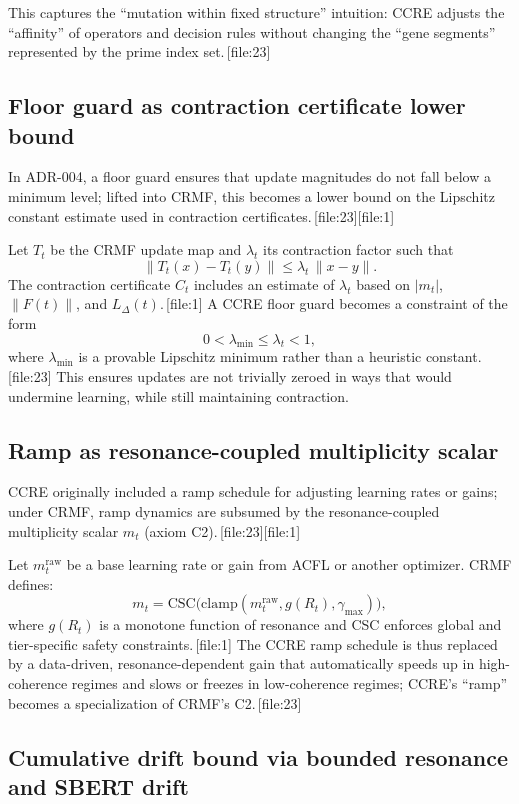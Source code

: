 \documentclass[11pt]{article}
\begin{document}
This captures the ``mutation within fixed structure'' intuition: CCRE adjusts the ``affinity'' of operators and decision rules without changing the ``gene segments'' represented by the prime index set.\,[file:23]

\subsection{Floor guard as contraction certificate lower bound}

In ADR-004, a floor guard ensures that update magnitudes do not fall below a minimum level; lifted into CRMF, this becomes a lower bound on the Lipschitz constant estimate used in contraction certificates.\,[file:23][file:1]

Let $T_t$ be the CRMF update map and $\lambda_t$ its contraction factor such that
\[
  \|T_t(x) - T_t(y)\| \le \lambda_t\,\|x-y\|.
\]
The contraction certificate $C_t$ includes an estimate of $\lambda_t$ based on $|m_t|$, $\|F(t)\|$, and $L_\Delta(t)$.\,[file:1]
A CCRE floor guard becomes a constraint of the form
\[
  0 < \lambda_{\text{min}} \le \lambda_t < 1,
\]
where $\lambda_{\text{min}}$ is a provable Lipschitz minimum rather than a heuristic constant.\,[file:23]
This ensures updates are not trivially zeroed in ways that would undermine learning, while still maintaining contraction.

\subsection{Ramp as resonance-coupled multiplicity scalar}

CCRE originally included a ramp schedule for adjusting learning rates or gains; under CRMF, ramp dynamics are subsumed by the resonance-coupled multiplicity scalar $m_t$ (axiom C2).\,[file:23][file:1]

Let $m^{\mathrm{raw}}_t$ be a base learning rate or gain from ACFL or another optimizer.
CRMF defines:
\[
  m_t = \mathrm{CSC}\bigl(\mathrm{clamp}(m^{\mathrm{raw}}_t, g(R_t), \gamma_{\max})\bigr),
\]
where $g(R_t)$ is a monotone function of resonance and CSC enforces global and tier-specific safety constraints.\,[file:1]
The CCRE ramp schedule is thus replaced by a data-driven, resonance-dependent gain that automatically speeds up in high-coherence regimes and slows or freezes in low-coherence regimes; CCRE's ``ramp'' becomes a specialization of CRMF's C2.\,[file:23]

\subsection{Cumulative drift bound via bounded resonance and SBERT drift}
\end{document}

